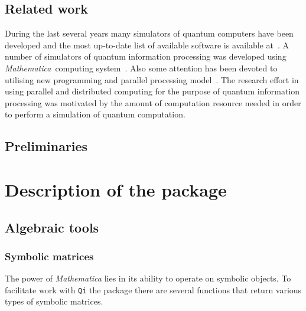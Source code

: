 \documentclass[11pt,a4paper]{article}
\newcommand{\qi}{\texttt{Qi}}
\newcommand{\Mathematica}{\emph{Mathematica}}
\newcommand{\1}{{\bf 1}}
\begin{document}
\subsection{Related work}

During the last several years many simulators of quantum computers have been
developed and the most up-to-date list of available software is available
at~\cite{quantiki-simulators}. A number of simulators of quantum information
processing was developed using \Mathematica\ computing system~\cite{qucalc,
qdensity, quantum2, miszczak12generating, qcwave}. Also some attention has been
devoted to utilising new programming \cite{gutierrez10cuda} and parallel
processing model~\cite{glendinning03parallelization, deraedt07massively,
tabakin09qcmpi}. The research effort in using parallel and distributed computing
for the purpose of quantum information processing was motivated by the amount of
computation resource needed in order to perform a simulation of quantum
computation.

\subsection{Preliminaries}

\section{Description of the package}

\subsection{Algebraic tools}

\subsubsection{Symbolic matrices}
The power of \Mathematica{} lies in its ability to operate on symbolic objects.
To facilitate work with \qi{} the package there are several functions that 
return various types of symbolic matrices.
\end{document}
